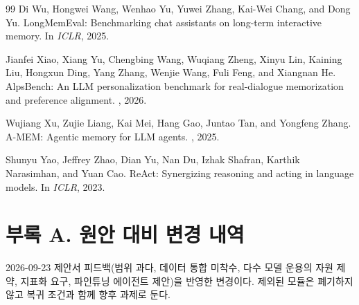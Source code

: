 \documentclass[10pt,twocolumn,letterpaper]{article}
\begin{document}
\begin{thebibliography}{99}
Di Wu, Hongwei Wang, Wenhao Yu, Yuwei Zhang, Kai-Wei Chang, and Dong Yu.
\newblock LongMemEval: Benchmarking chat assistants on long-term interactive memory.
\newblock In {\em ICLR}, 2025.

Jianfei Xiao, Xiang Yu, Chengbing Wang, Wuqiang Zheng, Xinyu Lin, Kaining Liu, Hongxun Ding, Yang Zhang, Wenjie Wang, Fuli Feng, and Xiangnan He.
\newblock AlpsBench: An LLM personalization benchmark for real-dialogue memorization and preference alignment.
, 2026.

Wujiang Xu, Zujie Liang, Kai Mei, Hang Gao, Juntao Tan, and Yongfeng Zhang.
\newblock A-MEM: Agentic memory for LLM agents.
, 2025.

Shunyu Yao, Jeffrey Zhao, Dian Yu, Nan Du, Izhak Shafran, Karthik Narasimhan, and Yuan Cao.
\newblock ReAct: Synergizing reasoning and acting in language models.
\newblock In {\em ICLR}, 2023.

\end{thebibliography}
\normalsize

\clearpage
\appendix
\onecolumn\raggedbottom
\section*{부록 A. 원안 대비 변경 내역}
2026-09-23 제안서 피드백(범위 과다, 데이터 통합 미착수, 다수 모델 운용의 자원 제약, 지표화 요구, 파인튜닝 에이전트 제안)을 반영한 변경이다. 제외된 모듈은 폐기하지 않고 복귀 조건과 함께 향후 과제로 둔다.
\end{document}
